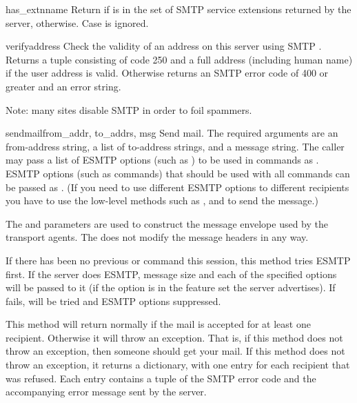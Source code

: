 \begin{methoddesc}{has_extn}{name}
Return  if  is in the set of SMTP service extensions
returned by the server,  otherwise.  Case is ignored.
\end{methoddesc}

\begin{methoddesc}{verify}{address}
Check the validity of an address on this server using SMTP .
Returns a tuple consisting of code 250 and a full  address
(including human name) if the user address is valid. Otherwise returns
an SMTP error code of 400 or greater and an error string.

Note: many sites disable SMTP  in order to foil spammers.
\end{methoddesc}

\begin{methoddesc}{sendmail}{from_addr, to_addrs, msg}
Send mail.  The required arguments are an  from-address
string, a list of  to-address strings, and a message string.
The caller may pass a list of ESMTP options (such as )
to be used in  commands as .  ESMTP
options (such as  commands) that should be used with all
 commands can be passed as .  (If you
need to use different ESMTP options to different recipients you have
to use the low-level methods such as ,  and
 to send the message.)

  The  and  parameters are
used to construct the message envelope used by the transport agents.
The  does not modify the message headers in any way.

If there has been no previous  or  command this
session, this method tries ESMTP  first. If the server does
ESMTP, message size and each of the specified options will be passed
to it (if the option is in the feature set the server advertises).  If
 fails,  will be tried and ESMTP options
suppressed.

This method will return normally if the mail is accepted for at least
one recipient. Otherwise it will throw an exception.  That is, if this
method does not throw an exception, then someone should get your mail.
If this method does not throw an exception, it returns a dictionary,
with one entry for each recipient that was refused.  Each entry
contains a tuple of the SMTP error code and the accompanying error
message sent by the server.


\end{methoddesc}
